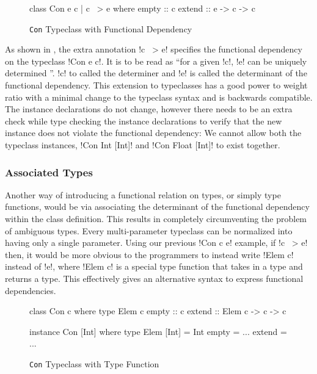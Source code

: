 \documentclass[manuscript,screen,nonacm]{acmart}
\begin{document}
\begin{figure}[ht]
\begin{CenteredBox}
\begin{code}
class Con e c | c ~> e where
  empty :: c
  extend :: e -> c -> c
\end{code}
\end{CenteredBox}
\caption[Con typeclass]{\lstinline{Con} Typeclass with Functional Dependency}
\label{fig:tc-collection-fd}
\end{figure}

As shown in , the extra annotation !c ~> e! specifies the functional dependency on the typeclass !Con e c!. It is to be read as ``for a given !c!, !e! can be uniquely determined ''. !c! to called the determiner and !e! is called the determinant of the functional dependency. This extension to typeclasses has a good power to weight ratio with a minimal change to the typeclass syntax and is backwards compatible. The instance declarations do not change, however there needs to be an extra check while type checking the instance declarations to verify that the new instance does not violate the functional dependency: We cannot allow both the typeclass instances, !Con Int [Int]! and !Con Float [Int]! to exist together.
%

\subsubsection{Associated Types}
Another way of introducing a functional relation on types, or simply type functions, would be via associating the determinant of the functional dependency within the class definition\cite{chakravarty_associated_2005}. This results in completely circumventing the problem of ambiguous types. Every multi-parameter typeclass can be normalized into having only a single parameter. Using our previous !Con c e! example, if !c ~> e! then, it would be more obvious to the programmers to instead write !Elem c! instead of !e!, where !Elem c! is a special type function that takes in a type and returns a type. This effectively gives an alternative syntax to express functional dependencies.
\begin{figure}[ht]
\begin{center}
\begin{minipage}[ht]{0.4\linewidth}
\begin{code}
class Con c where
  type Elem c
  empty :: c
  extend :: Elem c -> c -> c
\end{code}
\end{minipage}%
\begin{minipage}[ht]{0.4\linewidth}
\begin{code}
instance Con [Int] where
  type Elem [Int] = Int
  empty = ...
  extend = ...
\end{code}
\end{minipage}
\end{center}
\caption[Con typeclass]{\lstinline{Con} Typeclass with Type Function}
\label{fig:assoc-types}
\end{figure}
\end{document}
